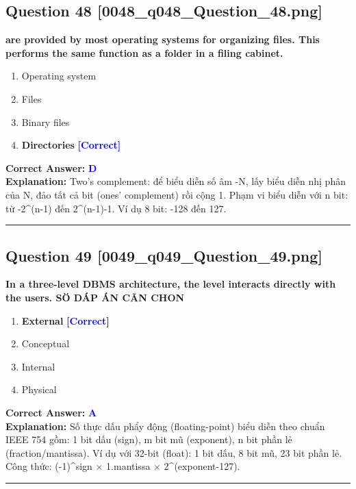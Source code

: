 \documentclass[11pt,a4paper]{article}
\begin{document}
\begin{minipage}{\textwidth}
\subsection*{Question 48 \quad \footnotesize{[0048\_q048\_Question\_48.png]}}
\noindent \textbf{are provided by most operating systems for organizing files. This performs the same function as a folder in a filing cabinet.}

\begin{enumerate}[label=\Alph*.]
    \item Operating system
    \item Files
    \item Binary files
    \item \textbf{Directories} \hfill \textcolor{blue}{\textbf{[Correct]}}
\end{enumerate}

\noindent \textbf{Correct Answer:} \textcolor{blue}{\textbf{D}} \\[2pt]
\noindent \textbf{Explanation:} Two's complement: để biểu diễn số âm -N, lấy biểu diễn nhị phân của N, đảo tất cả bit (ones' complement) rồi cộng 1. Phạm vi biểu diễn với n bit: từ -2\textasciicircum{}(n-1) đến 2\textasciicircum{}(n-1)-1. Ví dụ 8 bit: -128 đến 127.

\par\vspace{0.3cm}
\hrule
\vspace{0.3cm}
\end{minipage}

\begin{minipage}{\textwidth}
\subsection*{Question 49 \quad \footnotesize{[0049\_q049\_Question\_49.png]}}
\noindent \textbf{In a three-level DBMS architecture, the level interacts directly with the users. SÖ DÁP ÁN CÃN CHON}

\begin{enumerate}[label=\Alph*.]
    \item \textbf{External} \hfill \textcolor{blue}{\textbf{[Correct]}}
    \item Conceptual
    \item Internal
    \item Physical
\end{enumerate}

\noindent \textbf{Correct Answer:} \textcolor{blue}{\textbf{A}} \\[2pt]
\noindent \textbf{Explanation:} Số thực dấu phẩy động (floating-point) biểu diễn theo chuẩn IEEE 754 gồm: 1 bit dấu (sign), m bit mũ (exponent), n bit phần lẻ (fraction/mantissa). Ví dụ với 32-bit (float): 1 bit dấu, 8 bit mũ, 23 bit phần lẻ. Công thức: (-1)\textasciicircum{}sign × 1.mantissa × 2\textasciicircum{}(exponent-127).

\par\vspace{0.3cm}
\hrule
\vspace{0.3cm}
\end{minipage}
\end{document}
